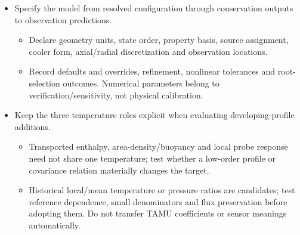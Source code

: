\begin{itemize}[leftmargin=*]
\item Specify the model from resolved configuration through conservation outputs to observation predictions.
\begin{itemize}
\item Declare geometry units, state order, property basis, source assignment, cooler form, axial/\allowbreak{}radial discretization and observation locations.
\item Record defaults and overrides, refinement, nonlinear tolerances and root-selection outcomes. Numerical parameters belong to verification/\allowbreak{}sensitivity, not physical calibration.
\end{itemize}
\item Keep the three temperature roles explicit when evaluating developing-profile additions.
\begin{itemize}
\item Transported enthalpy, area-density/\allowbreak{}buoyancy and local probe response need not share one temperature; test whether a low-order profile or covariance relation materially changes the target.
\item Historical local/\allowbreak{}mean temperature or pressure ratios are candidates; test reference dependence, small denominators and flux preservation before adopting them. Do not transfer TAMU coefficients or sensor meanings automatically.
\end{itemize}
\end{itemize}
